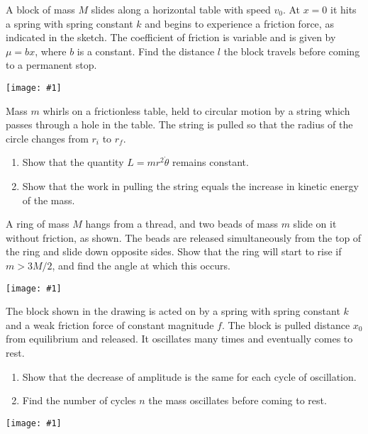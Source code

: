 \documentclass[12pt,letterpaper]{hmcpset}
\newcommand{\diagram}[1]{\begin{center} \texttt{[image: \#1]} \end{center}}
\begin{document}

\begin{problem}
    A block of mass $M$ slides along a
    horizontal table with speed $v_{0}$. At $x
    = 0$ it hits a spring with spring constant
    $k$ and begins to experience a friction
    force, as indicated in the sketch. The
    coefficient of friction is variable and
    is given by $\mu = b x$, where $b$ is a
    constant. Find the distance $l$ the block
    travels before coming to a permanent stop.
    \diagram{img/5_2.png}
\end{problem}

\begin{solution}
    \vfill
\end{solution}
\newpage

\begin{problem}
    Mass $m$ whirls on a frictionless table,
    held to circular motion by a string
    which passes through a hole in the table.
    The string is pulled so that the
    radius of the circle changes from $r_i$ to $r_f$.
    \begin{enumerate}
    \item Show that the quantity $L = m r^2 \dot{\theta}$
        remains constant.
    \item Show that the work in pulling the
        string equals the increase in
        kinetic energy of the mass.
    \end{enumerate}
\end{problem}

\begin{solution}
    \vfill
\end{solution}
\newpage

\begin{problem}
  A ring of mass $M$ hangs from a thread, and two beads of mass $m$ slide on it
  without friction, as shown. The beads are released simultaneously from the top
  of the ring and slide down opposite sides. Show that the ring will start to
  rise if $m > 3M/2$, and find the angle at which this occurs.
  \diagram{img/5_7.png}
\end{problem}

\begin{solution}
    \vfill
\end{solution}
\newpage

\begin{problem}
  The block shown in the drawing is acted on by a spring with spring constant
  $k$ and a weak friction force of constant magnitude $f$. The block is pulled
  distance $x_{0}$ from equilibrium and released. It oscillates many times and
  eventually comes to rest.
  \begin{enumerate}
    \item Show that the decrease of amplitude is the same for each cycle of
      oscillation.
    \item Find the number of cycles $n$ the mass oscillates before coming to
      rest.
  \end{enumerate}
  \diagram{img/5_8.png}
\end{problem}
\end{document}
